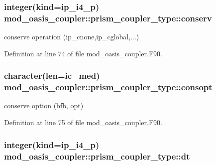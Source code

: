 \hypertarget{structmod__oasis__coupler_1_1prism__coupler__type_a6ae875acb2785153668c3e773ed9682f}{
\subsubsection[{conserv}]{\setlength{\rightskip}{0pt plus 5cm}integer(kind=ip\+\_\+i4\+\_\+p) mod\+\_\+oasis\+\_\+coupler\+::prism\+\_\+coupler\+\_\+type\+::conserv\hspace{0.3cm}{\ttfamily [private]}}}\label{structmod__oasis__coupler_1_1prism__coupler__type_a6ae875acb2785153668c3e773ed9682f}


conserve operation (ip\+\_\+cnone,ip\+\_\+cglobal,...) 



Definition at line 74 of file mod\+\_\+oasis\+\_\+coupler.\+F90.

\hypertarget{structmod__oasis__coupler_1_1prism__coupler__type_ab539821ab680aa56c81cb541c093f50f}{
\subsubsection[{consopt}]{\setlength{\rightskip}{0pt plus 5cm}character(len=ic\+\_\+med) mod\+\_\+oasis\+\_\+coupler\+::prism\+\_\+coupler\+\_\+type\+::consopt\hspace{0.3cm}{\ttfamily [private]}}}\label{structmod__oasis__coupler_1_1prism__coupler__type_ab539821ab680aa56c81cb541c093f50f}


conserve option (bfb, opt) 



Definition at line 75 of file mod\+\_\+oasis\+\_\+coupler.\+F90.

\hypertarget{structmod__oasis__coupler_1_1prism__coupler__type_ae1c1191f9aa4664aac2b819d1648320d}{
\subsubsection[{dt}]{\setlength{\rightskip}{0pt plus 5cm}integer(kind=ip\+\_\+i4\+\_\+p) mod\+\_\+oasis\+\_\+coupler\+::prism\+\_\+coupler\+\_\+type\+::dt\hspace{0.3cm}{\ttfamily [private]}}}\label{structmod__oasis__coupler_1_1prism__coupler__type_ae1c1191f9aa4664aac2b819d1648320d}


